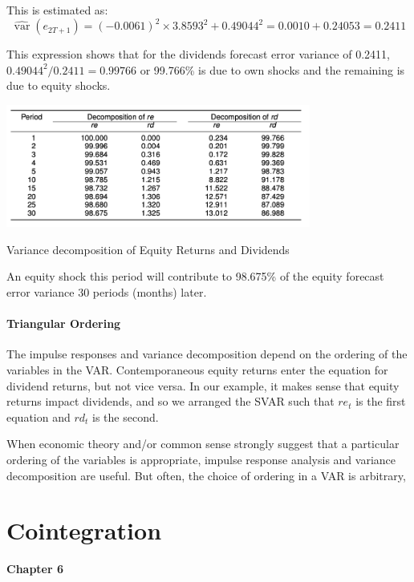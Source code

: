 \documentclass[11pt]{article}
\begin{document}
This is estimated as:
\begin{equation}
\widehat{\operatorname{var}}\left(e_{2 T+1}\right)=(-0.0061)^2 \times 3.8593^2+0.49044^2=0.0010+0.24053=0.2411
\end{equation}

This expression shows that for the dividends forecast error variance of 0.2411, $0.49044^2/0.2411 = 0.99766$ or 99.766\% is due to own shocks and the remaining is due to equity shocks.

\begin{table}[h]
    \centering
    \includegraphics[width=10cm]{pics/variance decomp table.png}
    \caption{Variance decomposition of Equity Returns and Dividends}
    \label{tab:variance decomposition}
\end{table}

An equity shock this period will contribute to 98.675\% of the equity forecast error variance 30 periods (months) later.

\paragraph{Triangular Ordering} \mbox{}

The impulse responses and variance decomposition depend on the ordering of the variables in the VAR. Contemporaneous equity returns enter the equation for dividend returns, but not vice versa. In our example, it makes sense that equity returns impact dividends, and so we arranged the SVAR such that $re_t$ is the first equation and $rd_t$ is the second.

When economic theory and/or common sense strongly suggest that a particular ordering of the variables is appropriate, impulse response analysis and variance decomposition are useful. But often, the choice of ordering in a VAR is arbitrary,







\newpage
\section{Cointegration}
\textbf{Chapter 6}
\end{document}
